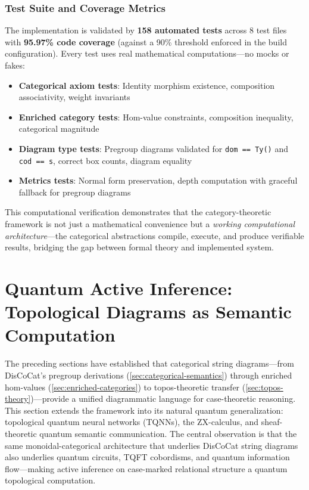 \documentclass[
]{article}
\providecommand{\tightlist}{%
  \setlength{\itemsep}{0pt}\setlength{\parskip}{0pt}}
\numberwithin{equation}{section}
\begin{document}
\subsubsection{Test Suite and Coverage
Metrics}\label{test-suite-and-coverage-metrics}

The implementation is validated by \textbf{158 automated tests} across 8
test files with \textbf{95.97\% code coverage} (against a 90\% threshold
enforced in the build configuration). Every test uses real mathematical
computations---no mocks or fakes:

\begin{itemize}
\tightlist
\item
  \textbf{Categorical axiom tests}: Identity morphism existence,
  composition associativity, weight invariants
\item
  \textbf{Enriched category tests}: Hom-value constraints, composition
  inequality, categorical magnitude
\item
  \textbf{Diagram type tests}: Pregroup diagrams validated for
  \texttt{dom\ ==\ Ty()} and \texttt{cod\ ==\ s}, correct box counts,
  diagram equality
\item
  \textbf{Metrics tests}: Normal form preservation, depth computation
  with graceful fallback for pregroup diagrams
\end{itemize}

This computational verification demonstrates that the category-theoretic
framework is not just a mathematical convenience but a \emph{working
computational architecture}---the categorical abstractions compile,
execute, and produce verifiable results, bridging the gap between formal
theory and implemented system.

\newpage

\section{Quantum Active Inference: Topological Diagrams as Semantic
Computation}\label{sec:quantum-active-inference}

The preceding sections have established that categorical string
diagrams---from DisCoCat's pregroup derivations
(\autoref{sec:categorical-semantics}) through enriched hom-values
(\autoref{sec:enriched-categories}) to topos-theoretic transfer
(\autoref{sec:topos-theory})---provide a unified diagrammatic language
for case-theoretic reasoning. This section extends the framework into
its natural quantum generalization: topological quantum neural networks
(TQNNs), the ZX-calculus, and sheaf-theoretic quantum semantic
communication. The central observation is that the same
monoidal-categorical architecture that underlies DisCoCat string
diagrams also underlies quantum circuits, TQFT cobordisms, and quantum
information flow---making active inference on case-marked relational
structure a quantum topological computation.
\end{document}
